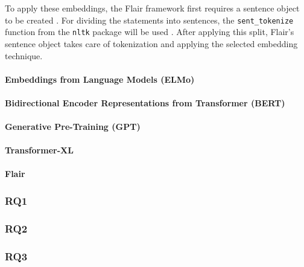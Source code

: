 To apply these embeddings, the Flair framework first requires a sentence object to be created \cite{flairsentence}.
For dividing the statements into sentences, the \texttt{sent\_tokenize} function from the \texttt{nltk} package will be used \cite{nltktokenize}. 
After applying this split, Flair's sentence object takes care of tokenization and applying the selected embedding technique.

\paragraph{Embeddings from Language Models (ELMo)}

\paragraph{Bidirectional Encoder Representations from Transformer (BERT)}

\paragraph{Generative Pre-Training (GPT)}

\paragraph{Transformer-XL}

\paragraph{Flair}

\subsubsection{RQ1}

\subsubsection{RQ2}

\subsubsection{RQ3}
